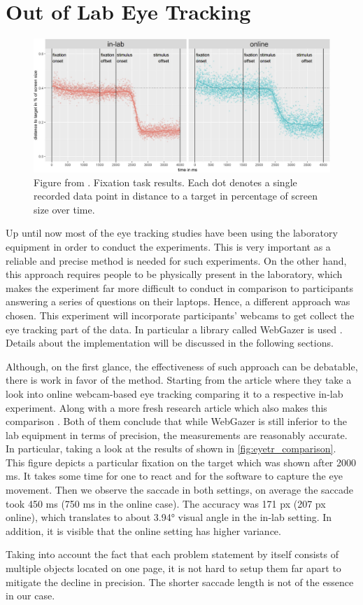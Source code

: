 \section{Out of Lab Eye Tracking} \label{sec:eyetr}
\begin{figure}
    \centering
    \includegraphics[width=1\linewidth]{images/tracker_comparison.png}
    \caption{Figure from \cite{Semmelmann_2018}. Fixation task results. Each dot denotes a single recorded data point in distance to a target in percentage of screen size over time.}
    \label{fig:eyetr_comparison}
\end{figure}
Up until now most of the eye tracking studies have been using the laboratory equipment in order to conduct the experiments. This is very important as a reliable and precise method is needed for such experiments. On the other hand, this approach requires people to be physically present in the laboratory, which makes the experiment far more difficult to conduct in comparison to participants answering a series of questions on their laptops. Hence, a different approach was chosen. This experiment will incorporate participants' webcams to get collect the eye tracking part of the data. In particular a library called WebGazer is used \cite{webgazer}. Details about the implementation will be discussed in the following sections. 

Although, on the first glance, the effectiveness of such approach can be debatable, there is work in favor of the method. Starting from the article \cite{Semmelmann_2018} where they take a look into online webcam-based eye tracking comparing it to a respective in-lab experiment. Along with a more fresh research article which also makes this comparison \citep{Wisiecka_2022}. Both of them conclude that while WebGazer is still inferior to the lab equipment in terms of precision, the measurements are reasonably accurate. In particular, taking a look at the results of \cite{Semmelmann_2018} shown in \autoref{fig:eyetr_comparison}. This figure depicts a particular fixation on the target which was shown after 2000 ms. It takes some time for one to react and for the software to capture the eye movement. Then we observe the saccade in both settings, on average the saccade took 450 ms (750 ms in the online case). The accuracy was 171 px (207 px online), which translates to about 3.94° visual angle in the in-lab setting. In addition, it is visible that the online setting has higher variance.

Taking into account the fact that each problem statement by itself consists of multiple objects located on one page, it is not hard to setup them far apart to mitigate the decline in precision. The shorter saccade length is not of the essence in our case.

